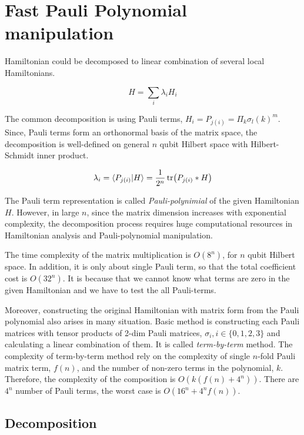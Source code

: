 \chapter{Fast Pauli Polynomial manipulation}
\label{appendix:FPPM}
Hamiltonian could be decomposed to linear combination of 
several local Hamiltonians.

\begin{equation}
    H = \sum_i \lambda_i H_i
\end{equation}

The common decomposition is using Pauli terms, $H_i = P_{j(i)} = \Pi_{k} \sigma_l(k)^m$.
Since, Pauli terms form an orthonormal basis of the matrix space, 
the decomposition is well-defined on general $n$ qubit Hilbert space with 
Hilbert-Schmidt inner product.

\begin{equation}
    \lambda_i = \langle P_{j(i)} | H \rangle = \frac{1}{2^n} \tr(P_{j(i)} * H)
\end{equation}

The Pauli term representation is called \textit{Pauli-polynimial} of the given Hamiltonian $H$.
However, in large $n$, since the matrix dimension increases with exponential complexity,
the decomposition process requires huge computational resources 
in Hamiltonian analysis and Pauli-polynomial manipulation.

The time complexity of the matrix multiplication is $O(8^n)$, for $n$ qubit Hilbert space.
In addition, it is only about single Pauli term, so that the total coefficient cost is 
$O(32^n)$. It is because that we cannot know what terms are zero in the given 
Hamiltonian and we have to test the all Pauli-terms.

Moreover, constructing the original Hamiltonian with matrix form
from the Pauli polynomial also arises in many situation.
Basic method is constructing each Pauli matrices with tensor products 
of 2-dim Pauli matrices, $\sigma_{i}, i \in \{0, 1, 2, 3\}$ 
and calculating a linear combination of them.
It is called \textit{term-by-term} method.
The complexity of term-by-term method rely on the complexity of 
single $n$-fold Pauli matrix term, $f(n)$,
and the number of non-zero terms in the polynomial, $k$.
Therefore, the complexity of the composition is $O(k(f(n) + 4^n))$.
There are $4^n$ number of Pauli terms, the worst case is $O(16^n + 4^n f(n))$.


\section{Decomposition}

